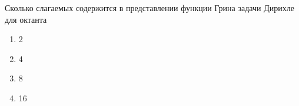 Сколько слагаемых содержится в представлении функции Грина задачи Дирихле для октанта

\begin{enumerate}[label=\arabic*)]
    \item 2
    \item 4
    \item 8
    \item 16
\end{enumerate}

